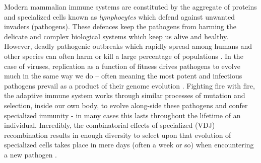 \documentclass{article}
\begin{document}
Modern mammalian immune systems are constituted by the aggregate of proteins and specialized cells known as \textit{lymphocytes} which
defend against unwanted invaders (pathogens).
These defences keep the pathogens from harming the delicate and complex biological systems which keep us alive and healthy.
However, deadly pathogenic outbreaks which rapidly spread among humans and other species can often harm or kill a large percentage of populations \citep{Wu2020}.
In the case of viruses, replication as a function of fitness drives pathogens to evolve much in the same way we do --
often meaning the most potent and infectious pathogens prevail as a product of their genome evolution \citep{Twiddy2003, Felsenstein1981-zs}.
Fighting fire with fire, the adaptive immune system works through similar processes of mutation and selection, inside our own body,
to evolve along-side these pathogens and confer specialized immunity - in many cases this lasts throughout the lifetime of an individual.
Incredibly, the combinatorial effects of specialized (VDJ) recombination results in enough diversity to select upon that evolution of specialized cells
takes place in mere days (often a week or so) when encountering a new pathogen \citep{Jung2004}.

~
\end{document}
